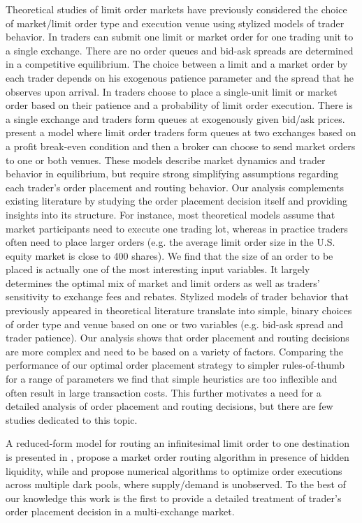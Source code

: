 \documentclass[opre,nonblindrev]{informs3}
\begin{document}
Theoretical studies of limit order markets have previously considered the choice of market/limit order type and execution venue using  stylized models of trader behavior. In \citet{Foucault1999, foucault05, rosu09} traders can submit one limit or market order for one trading unit to a single exchange. There are no order queues and bid-ask spreads are determined in a competitive equilibrium. The choice between a limit and a market order by each trader depends on his exogenous patience parameter and the spread that he observes upon arrival. In \citet{parlour98} traders choose to place a single-unit limit or market order based on their patience and a probability of limit order execution. There is a single exchange and traders form queues at exogenously given bid/ask prices. \citet{Foucault2008} present a model where limit order traders form queues at two exchanges based on a profit break-even condition and then a broker can choose to send market orders to one or both venues. These models describe market dynamics and trader behavior in equilibrium, but require strong simplifying assumptions regarding each trader's order placement and routing behavior. Our analysis complements existing literature by studying the order placement decision itself and providing insights into its structure. For instance, most theoretical models assume that market participants need to execute one trading lot, whereas in practice traders often need to place larger orders (e.g. the average limit order size in the U.S. equity market is close to 400 shares). We find that the size of an order to be placed is actually one of the most interesting input variables. It largely determines the optimal mix of market and limit orders as well as traders' sensitivity to exchange fees and rebates. Stylized models of trader behavior that previously appeared in theoretical literature translate into simple, binary choices of order type and venue based on one or two variables (e.g. bid-ask spread and trader patience). Our analysis shows that order placement and routing decisions are more complex and need to be based on a variety of factors. Comparing the performance of our optimal order placement strategy to simpler rules-of-thumb for a range of parameters we find that simple heuristics are too inflexible and often result in large transaction costs.
This further motivates a need for a detailed analysis of order placement and routing decisions, but there are few studies dedicated to this topic.

A reduced-form model for routing an infinitesimal limit order to one destination is presented in \cite{Moallemi2011}, \cite{almgrenharts} propose a market order routing algorithm in presence of hidden liquidity, while \cite{Ganchev2010} and \cite{Laruelle2009} propose numerical algorithms to optimize order executions across multiple dark pools, where supply/demand is unobserved.  To the best of our knowledge this work is the first to provide a detailed treatment of trader's order placement decision in a multi-exchange market.
\end{document}
